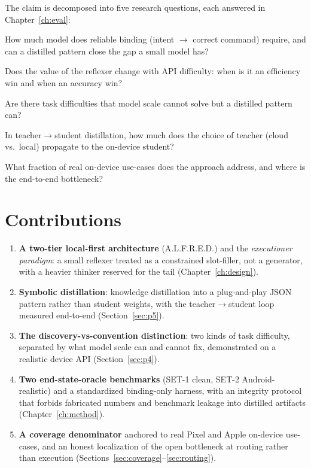 The claim is decomposed into five research questions, each answered in
Chapter~\ref{ch:eval}:

\begin{description}[leftmargin=2.2em,style=nextline]
  \item[RQ1 (scale vs.\ distillation)] How much model does reliable binding
    (intent $\rightarrow$ correct command) require, and can a distilled pattern
    close the gap a small model has?
  \item[RQ2 (the spectrum)] Does the value of the reflexer change with API
    difficulty: when is it an efficiency win and when an accuracy win?
  \item[RQ3 (the limit of scale)] Are there task difficulties that model scale
    cannot solve but a distilled pattern can?
  \item[RQ4 (teacher quality)] In teacher$\rightarrow$student distillation, how
    much does the choice of teacher (cloud vs.\ local) propagate to the on-device
    student?
  \item[RQ5 (coverage and routing)] What fraction of real on-device use-cases
    does the approach address, and where is the end-to-end bottleneck?
\end{description}

\section{Contributions}
\label{sec:contributions}

\begin{enumerate}[leftmargin=2em]
  \item \textbf{A two-tier local-first architecture} (A.L.F.R.E.D.) and the
    \emph{executioner paradigm}: a small reflexer treated as a constrained
    slot-filler, not a generator, with a heavier thinker reserved for the tail
    (Chapter~\ref{ch:design}).
  \item \textbf{Symbolic distillation}: knowledge distillation into a
    plug-and-play JSON pattern rather than student weights, with the
    teacher$\rightarrow$student loop measured end-to-end (Section~\ref{sec:p5}).
  \item \textbf{The discovery-vs-convention distinction}: two kinds of task
    difficulty, separated by what model scale can and cannot fix, demonstrated on
    a realistic device API (Section~\ref{sec:p4}).
  \item \textbf{Two end-state-oracle benchmarks} (SET-1 clean, SET-2
    Android-realistic) and a standardized binding-only harness, with an integrity
    protocol that forbids fabricated numbers and benchmark leakage into distilled
    artifacts (Chapter~\ref{ch:method}).
  \item \textbf{A coverage denominator} anchored to real Pixel and Apple
    on-device use-cases, and an honest localization of the open bottleneck at
    routing rather than execution (Sections~\ref{sec:coverage}--\ref{sec:routing}).
\end{enumerate}

